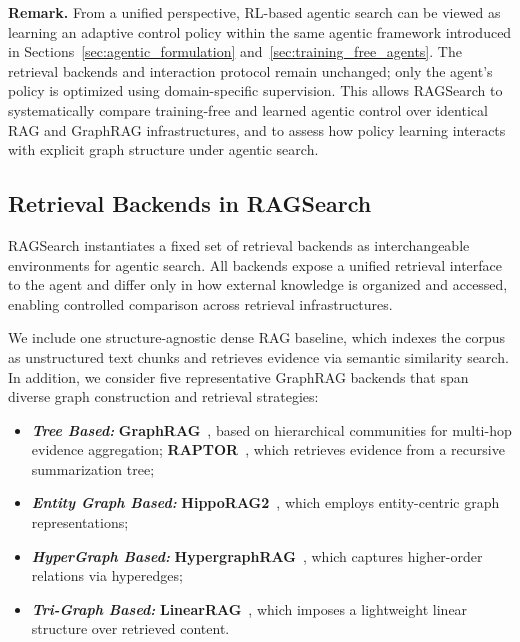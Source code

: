 \noindent\textbf{Remark.}
From a unified perspective, RL-based agentic search can be viewed as learning an adaptive control policy within the same agentic framework introduced in Sections~\ref{sec:agentic_formulation} and~\ref{sec:training_free_agents}. The retrieval backends and interaction protocol remain unchanged; only the agent’s policy is optimized using domain-specific supervision. This allows RAGSearch to systematically compare training-free and learned agentic control over identical RAG and GraphRAG infrastructures, and to assess how policy learning interacts with explicit graph structure under agentic search.

\subsection{Retrieval Backends in RAGSearch}
\label{sec:retrieval_backends}

RAGSearch instantiates a fixed set of retrieval backends as interchangeable environments for agentic search. All backends expose a unified retrieval interface to the agent and differ only in how external knowledge is organized and accessed, enabling controlled comparison across retrieval infrastructures.

We include one structure-agnostic dense RAG baseline, which indexes the corpus as unstructured text chunks and retrieves evidence via semantic similarity search. In addition, we consider five representative GraphRAG backends that span diverse graph construction and retrieval strategies:
\begin{itemize}[leftmargin=*]
\item \textbf{\textit{Tree Based:}} \textbf{GraphRAG}~\cite{edge2024local}, based on hierarchical communities for multi-hop evidence aggregation; \textbf{RAPTOR}~\cite{sarthi2024raptor}, which retrieves evidence from a recursive summarization tree;
\item \textbf{\textit{Entity Graph Based:}} \textbf{HippoRAG2}~\cite{gutiérrez2025hipporag2}, which employs entity-centric graph representations;
\item \textbf{\textit{HyperGraph Based:}}   \textbf{HypergraphRAG}~\cite{luo2025hypergraphrag}, which captures higher-order relations via hyperedges;
\item \textbf{\textit{Tri-Graph Based:}} \textbf{LinearRAG}~\cite{zhuang2025linearrag}, which imposes a lightweight linear structure over retrieved content.
\end{itemize}

